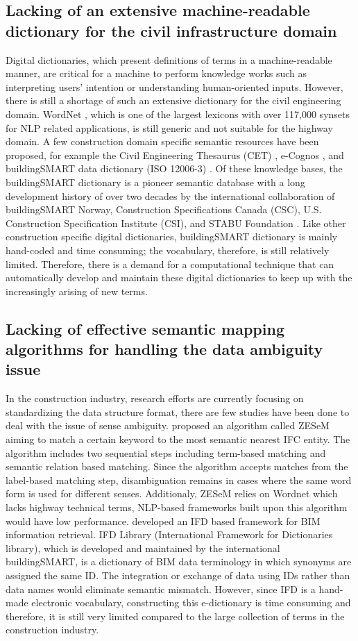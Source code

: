\documentclass[Journal, InsideFigs, DoubleSpace]{ascelike} %
\begin{document}
\subsection{Lacking of an extensive machine-readable dictionary for the civil infrastructure domain}
Digital dictionaries, which present definitions of terms in a machine-readable manner, are critical for a machine to perform knowledge works such as interpreting users' intention or understanding human-oriented inputs. However, there is still a shortage of such an extensive dictionary for the civil engineering domain. WordNet \cite{miller95}, which is one of the largest lexicons with over 117,000 synsets for NLP related applications, is still generic and not suitable for the highway domain. A few construction domain specific semantic resources have been proposed, for example the Civil Engineering Thesaurus (CET) \cite{abuzir02}, e-Cognos  \cite{wetherill02}, and buildingSMART data dictionary (ISO 12006-3) \cite{buildingsmartData}. Of these knowledge bases, the buildingSMART dictionary is a pioneer semantic database with a long development history of over two decades by the international collaboration of buildingSMART Norway, Construction Specifications Canada (CSC), U.S. Construction Specification Institute (CSI), and STABU Foundation \cite{hezik08}. Like other construction specific digital dictionaries, buildingSMART dictionary is mainly hand-coded and time consuming; the vocabulary, therefore, is still relatively limited. Therefore, there is a demand for a computational technique that can automatically develop and maintain these digital dictionaries to keep up with the increasingly arising of new terms. 
%
\subsection{Lacking of effective semantic mapping algorithms for handling the data ambiguity issue}
In the construction industry, research efforts are currently focusing on standardizing the data structure format, there are few studies have been done to deal with the issue of sense ambiguity. \cite{Zhang15c} proposed an algorithm called ZESeM aiming to match a certain keyword to the most semantic nearest IFC entity. The algorithm includes two sequential steps including term-based matching and semantic relation based matching. Since the algorithm accepts matches from the label-based matching step, disambiguation remains in cases where the same word form is used for different senses. Additionaly, ZESeM relies on Wordnet which lacks highway technical terms, NLP-based frameworks built upon this algorithm would have low performance.  \cite{Lin15} developed an IFD based framework for BIM information retrieval. IFD Library (International Framework for Dictionaries library), which is developed and maintained by the international buildingSMART, is a dictionary of BIM data terminology in which synonyms are assigned the same ID. The integration or exchange of data using IDs rather than data names would eliminate semantic mismatch. However, since IFD is a hand-made electronic vocabulary, constructing this e-dictionary is time consuming and therefore, it is still very limited compared to the large collection of terms in the construction industry.
%
\end{document}
